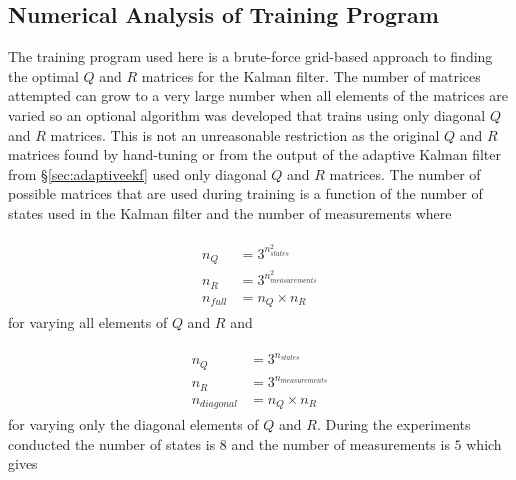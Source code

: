 
\subsection{Numerical Analysis of Training Program}
\label{sec:trainingNumericalAnalysis}
The training program used here is a brute-force grid-based approach to finding the optimal $Q$ and $R$ matrices for the Kalman filter. The number of matrices attempted can grow to a very large number when all elements of the matrices are varied so an optional algorithm was developed that trains using only diagonal $Q$ and $R$ matrices. This is not an unreasonable restriction as the original $Q$ and $R$ matrices found by hand-tuning or from the output of the adaptive Kalman filter from \S\ref{sec:adaptiveekf} used only diagonal $Q$ and $R$ matrices. The number of possible matrices that are used during training is a function of the number of states used in the Kalman filter and the number of measurements where

\begin{align*}
\begin{split}
n_Q &= 3^{n_{states}^2} \\
n_R &= 3^{n_{measurements}^2} \\
n_{full} &= n_Q \times n_R
\end{split}
\end{align*}
for varying all elements of $Q$ and $R$ and

\begin{align*}
\begin{split}
n_Q &= 3^{n_{states}} \\
n_R &= 3^{n_{measurements}} \\
n_{diagonal} &= n_Q \times n_R
\end{split}
\end{align*}
for varying only the diagonal elements of $Q$ and $R$. During the experiments conducted the number of states is $8$ and the number of measurements is $5$ which gives

